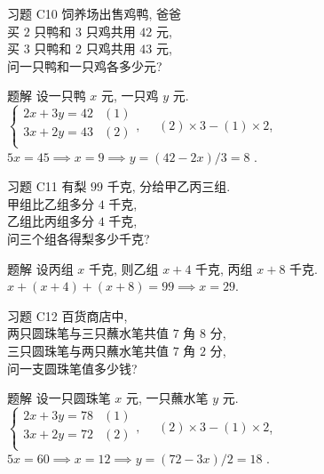 \documentclass[content.tex]{subfiles}
\begin{document}
\begin{frame}{习题 C10}
饲养场出售鸡鸭, 爸爸 \\
买 $2$ 只鸭和 $3$ 只鸡共用 $42$ 元, \\
买 $3$ 只鸭和 $2$ 只鸡共用 $43$ 元, \\
问一只鸭和一只鸡各多少元?
\begin{exampleblock}{题解}
设一只鸭 $x$ 元, 一只鸡 $y$ 元. \\
$
\begin{cases}
2x + 3y = 42   & (1) \\
3x + 2y = 43   & (2) \\
\end{cases}, \quad
$ $(2) \times 3 - (1) \times 2$, \\
$5x=45\implies x=9\implies y=(42-2x)/3=8$ .
\end{exampleblock}
\end{frame}

\begin{frame}{习题 C11}
有梨 $99$ 千克, 分给甲乙丙三组. \\
甲组比乙组多分 $4$ 千克, \\
乙组比丙组多分 $4$ 千克, \\
问三个组各得梨多少千克?
\begin{exampleblock}{题解}
设丙组 $x$ 千克, 则乙组 $x + 4$ 千克, 丙组 $x + 8$ 千克. \\
$x + (x + 4) + (x + 8) = 99 \implies x=29$.
\end{exampleblock}
\end{frame}

\begin{frame}{习题 C12}
百货商店中, \\
两只圆珠笔与三只蘸水笔共值 $7$ 角 $8$ 分, \\
三只圆珠笔与两只蘸水笔共值 $7$ 角 $2$ 分, \\
问一支圆珠笔值多少钱?
\begin{exampleblock}{题解}
设一只圆珠笔 $x$ 元, 一只蘸水笔 $y$ 元. \\
$
\begin{cases}
2x + 3y = 78   & (1) \\
3x + 2y = 72   & (2) \\
\end{cases}, \quad
$ $(2) \times 3 - (1) \times 2$, \\
$5x=60\implies x=12\implies y=(72-3x)/2=18$ .
\end{exampleblock}
\end{frame}
\end{document}
